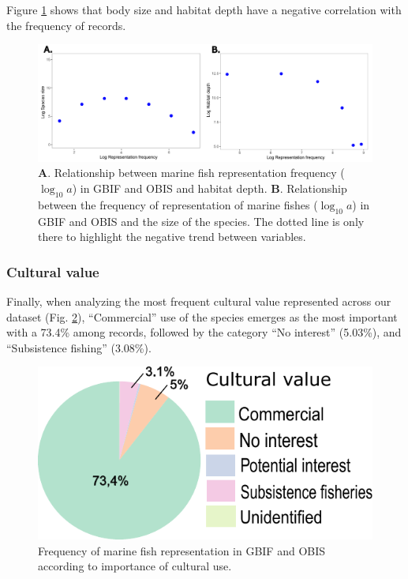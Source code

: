 \documentclass[12pt,authoryear]{elsarticle}
\begin{document}
Figure \ref{fig:A_depth_size} shows that body size and habitat depth have a negative correlation with the frequency of records. 

\begin{figure}[h]
  \centering
  \includegraphics[width=\textwidth]{Fig_5}
  \caption{\textbf{A}. Relationship between marine fish representation frequency ($\log_{10} a$) in GBIF and OBIS and habitat depth. \textbf{B}. Relationship between the frequency of representation of marine fishes ($\log_{10} a$) in GBIF and OBIS and the size of the species. The dotted line is only there to highlight the negative trend between variables.}
  \label{fig:A_depth_size}
\end{figure}

\subsubsection{Cultural value}
Finally, when analyzing the most frequent cultural value represented across our dataset (Fig. \ref{fig:A_importance}), ``Commercial'' use of the species emerges as the most important with a 73.4\% among records, followed by the category ``No interest'' (5.03\%), and ``Subsistence fishing'' (3.08\%). 


\begin{figure}[h]
  \centering
  \includegraphics[width=.65\textwidth]{old_Figs/Fig6}
  \caption{Frequency of marine fish representation in GBIF and OBIS according to importance of cultural use.}
  \label{fig:A_importance}
\end{figure}


\end{document}
